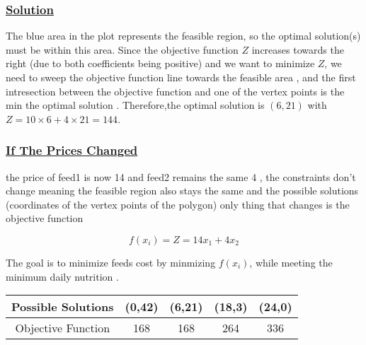 \subsubsection*{\underline{Solution}}

The blue area in the plot represents the feasible region, so the optimal solution(s) must be within this area. Since
the objective function \( Z \) increases towards the right (due to both coefficients being positive) and we want to
minimize \( Z \), we need to sweep the objective function line towards the feasible area , and the first intresection 
between the objective function and one of the vertex points is the min the optimal solution . Therefore,the optimal 
solution is \((6, 21)\) with \( Z = 10 \times 6 + 4 \times 21 = 144 \).

\vspace{0.25cm}
\subsubsection*{\underline{If The Prices Changed}}
the price of feed1 is now 14 and feed2 remains the same 4 , the constraints don't change meaning the feasible region
also stays the same and the possible solutions (coordinates of the vertex points of the polygon) only thing that
changes is the objective function 

\vspace{0.5cm}
\begin{tcolorbox}[title = New Objective Function]
\[
f(x_i) = Z = 14x_1 + 4x_2  
\]
\begin{center}
The goal is to minimize feeds cost by minmizing \(f(x_i)\), while meeting the minimum daily nutrition .
\end{center}
\end{tcolorbox}

\vspace{0.75cm} 
\begin{center}
    \begin{tabular}{|c|c|c|c|c|}
        \hline 
        Possible Solutions  & (0,42) & (6,21) & (18,3) & (24,0)\\
        \hline 
        Objective Function & 168 & 168 & 264 & 336\\
        \hline 
    \end{tabular}
\end{center}


